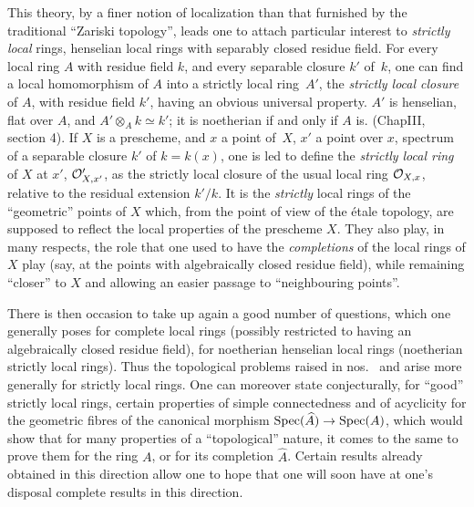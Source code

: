 This theory, by a finer notion of localization than that furnished by the traditional ``Zariski topology'', leads one to attach particular interest to \emph{strictly local} rings\label{pXIII.6}, \ie henselian local rings with separably closed residue field. For every local ring $A$ with residue field $k$, and every separable closure $k'$ of~$k$, one can find a local homomorphism of $A$ into a strictly local ring~$A'$, the \emph{strictly local closure} of $A$, with residue field $k'$, having an obvious universal property. $A'$ is henselian, flat over $A$, and $A'\otimes_A k\simeq k'$; it is noetherian if and only if $A$ is. (\Cf \loccit Chap\ptbl III, section 4). If $X$ is a prescheme, and $x$ a point of~$X$, $x'$ a point over $x$, spectrum of a separable closure $k'$ of $k=k(x)$, one is led to define the \emph{strictly local ring} of $X$ at $x'$, ${\mathcal O}'_{X, x'}$, as the strictly local closure of the usual local ring $\mathcal{O}_{X, x}$, relative to the residual extension $k'/k$. It is the \emph{strictly} local rings of the ``geometric'' points of $X$ which, from the point of view of the \'etale topology, are supposed to reflect the local properties of the prescheme $X$. They also play, in many respects, the role that one used to have the \emph{completions} of the local rings of $X$ play (say, at the points with algebraically closed residue field), while remaining ``closer'' to $X$ and allowing an easier passage to ``neighbouring points''.

There is then occasion to take up again a good number of questions, which one generally poses for complete local rings (possibly restricted to having an algebraically closed residue field), for noetherian henselian local rings (\resp noetherian strictly local rings). Thus the topological problems raised in nos.~ and  arise more generally for strictly local rings. One can moreover state conjecturally, for ``good'' strictly local rings, certain properties of simple connectedness and of acyclicity for the geometric fibres of the canonical morphism $\Spec(\widehat{A})\to\Spec(A)$, which would show that for many properties of a ``topological'' nature, it comes to the same to prove them for the ring $A$, or for its completion $\widehat{A}$. Certain results already obtained in this direction allow one to hope that one will soon have at one's disposal complete results in this direction.

